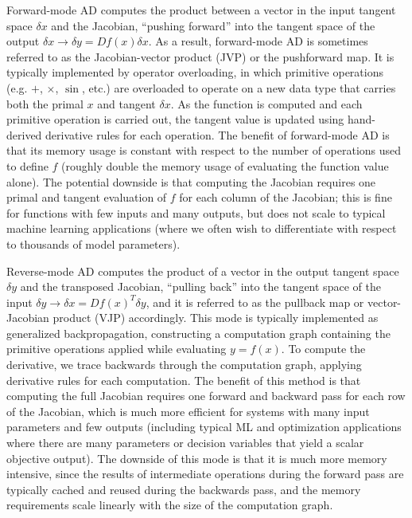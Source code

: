 Forward-mode AD computes the product between a vector in the input tangent space $\delta x$ and the Jacobian, ``pushing forward'' into the tangent space of the output $\delta x \rightarrow \delta y = Df(x) \delta x$. As a result, forward-mode AD is sometimes referred to as the Jacobian-vector product (JVP) or the pushforward map. It is typically implemented by operator overloading, in which primitive operations (e.g. $+$, $\times$, $\sin$, etc.) are overloaded to operate on a new data type that carries both the primal $x$ and tangent $\delta x$. As the function is computed and each primitive operation is carried out, the tangent value is updated using hand-derived derivative rules for each operation. The benefit of forward-mode AD is that its memory usage is constant with respect to the number of operations used to define $f$ (roughly double the memory usage of evaluating the function value alone). The potential downside is that computing the Jacobian requires one primal and tangent evaluation of $f$ for each column of the Jacobian; this is fine for functions with few inputs and many outputs, but does not scale to typical machine learning applications (where we often wish to differentiate with respect to thousands of model parameters).

Reverse-mode AD computes the product of a vector in the output tangent space $\delta y$ and the transposed Jacobian, ``pulling back'' into the tangent space of the input $\delta y \rightarrow \delta x = Df(x)^T \delta y$, and it is referred to as the pullback map or vector-Jacobian product (VJP) accordingly. This mode is typically implemented as generalized backpropagation, constructing a computation graph containing the primitive operations applied while evaluating $y = f(x)$. To compute the derivative, we trace backwards through the computation graph, applying derivative rules for each computation. The benefit of this method is that computing the full Jacobian requires one forward and backward pass for each row of the Jacobian, which is much more efficient for systems with many input parameters and few outputs (including typical ML and optimization applications where there are many parameters or decision variables that yield a scalar objective output). The downside of this mode is that it is much more memory intensive, since the results of intermediate operations during the forward pass are typically cached and reused during the backwards pass, and the memory requirements scale linearly with the size of the computation graph.

